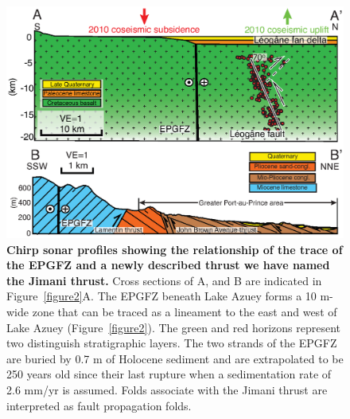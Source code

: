 \documentclass[linenumbers,draft]{agujournal}
\begin{document}
\begin{figure}
\centering
\includegraphics[width=\textwidth]{Haiti_figure3}
\caption{\textbf{Chirp sonar profiles showing the relationship of the trace of the EPGFZ and a newly described thrust we have named the Jimani thrust.} Cross sections of A, and B are indicated in Figure~\ref{figure2}A. The EPGFZ beneath Lake Azuey forms a 10 m-wide zone that can be traced as a lineament to the east and west of Lake Azuey (Figure~\ref{figure2}). The green and red horizons represent two distinguish stratigraphic layers. The two strands of the EPGFZ are buried by 0.7 m of Holocene sediment and are extrapolated to be 250 years old since their last rupture when a sedimentation rate of 2.6 mm/yr is assumed.  Folds associate with the Jimani thrust are interpreted as fault propagation folds.}
\label{figure6}
\end{figure}
\end{document}
